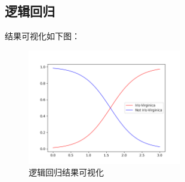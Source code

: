 \documentclass{../source/Experiment}
\begin{document}
    \subsection{逻辑回归}
    
    结果可视化如下图：
    \begin{figure}[H]
        \centering
        \includegraphics[width = 0.6\textwidth]{Part2/figure3.png}
        \caption{逻辑回归结果可视化}
    \end{figure}
\end{document}
